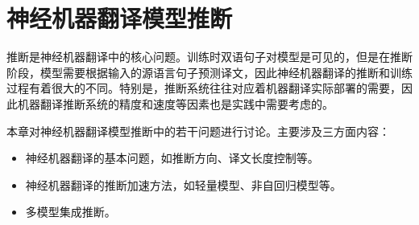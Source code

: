 
%


\renewcommand\figurename{图}%
\renewcommand\tablename{表}%


\chapter{神经机器翻译模型推断}

\parinterval 推断是神经机器翻译中的核心问题。训练时双语句子对模型是可见的，但是在推断阶段，模型需要根据输入的源语言句子预测译文，因此神经机器翻译的推断和训练过程有着很大的不同。特别是，推断系统往往对应着机器翻译实际部署的需要，因此机器翻译推断系统的精度和速度等因素也是实践中需要考虑的。

\parinterval 本章对神经机器翻译模型推断中的若干问题进行讨论。主要涉及三方面内容：

\begin{itemize}
\vspace{0.5em}
\item 神经机器翻译的基本问题，如推断方向、译文长度控制等。
\vspace{0.5em}
\item 神经机器翻译的推断加速方法，如轻量模型、非自回归模型等。
\vspace{0.5em}
\item 多模型集成推断。
\vspace{0.5em}
\end{itemize}
